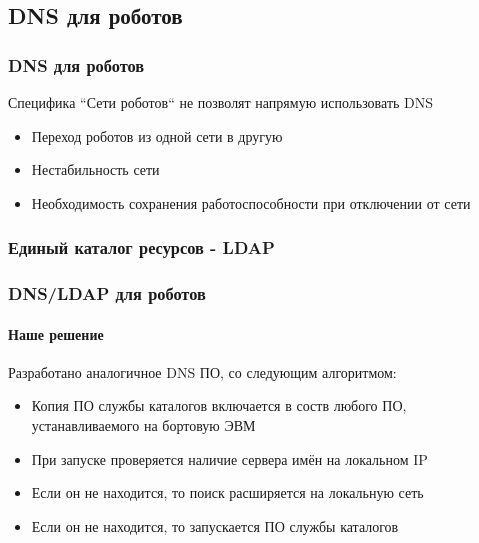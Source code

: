 \documentclass{beamer}
\begin{document}
\subsection{DNS для роботов}
\begin{frame}
\frametitle{DNS для роботов}
Специфика ``Сети роботов`` не позволят напрямую использовать DNS
\begin{itemize}
  \item<1> Переход роботов из одной сети в другую 
  \item<1> Нестабильность сети
  \item<1> Необходимость сохранения работоспособности при отключении от сети
\end{itemize}
\end{frame}

\begin{frame}
\frametitle{Единый каталог ресурсов - LDAP}
\end{frame}

\begin{frame}
\frametitle{DNS/LDAP для роботов}
\framesubtitle{Наше решение}
Разработано аналогичное DNS ПО, со следующим алгоритмом:
\begin{itemize}
  \item<1>Копия ПО службы каталогов включается в соств любого ПО,
  устанавливаемого на бортовую ЭВМ
  \item<1>При запуске проверяется наличие сервера имён на локальном IP
  \item<1>Если он не находится, то поиск расширяется на локальную сеть
  \item<1>Если он не находится, то запускается ПО службы каталогов
\end{itemize}
\end{frame}
\end{document}
